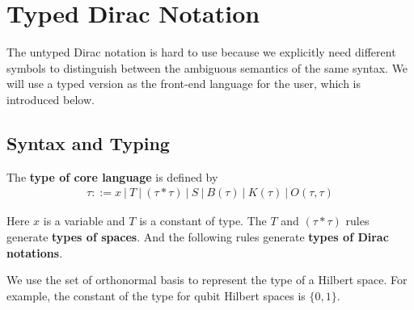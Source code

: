 \documentclass[manuscript, review, timestamp]{acmart}
\begin{document}

\section{Typed Dirac Notation}
The untyped Dirac notation is hard to use because we explicitly need different symbols to distinguish between the ambiguous semantics of the same syntax. We will use a typed version as the front-end language for the user, which is introduced below.



\subsection{Syntax and Typing}


\begin{definition}
  The \textbf{type of core language} is defined by
  \begin{align*}
    \tau ::= x\ |\ T\ |\ (\tau * \tau)\ |\ S\ |\ B(\tau)\ |\ K(\tau)\ |\ O(\tau, \tau)
  \end{align*}

  Here $x$ is a variable and $T$ is a constant of type. The $T$ and $(\tau * \tau)$ rules generate \textbf{types of spaces}. And the following rules generate \textbf{types of Dirac notations}.
\end{definition}
We use the set of orthonormal basis to represent the type of a Hilbert space. For example, the constant of the type for qubit Hilbert spaces is $\{0, 1\}$.
\end{document}
